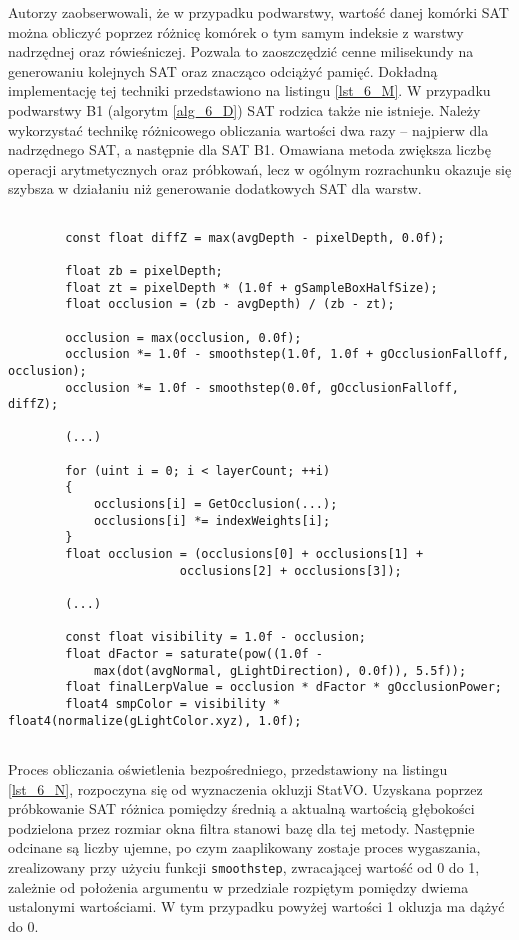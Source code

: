 		Autorzy \cite{statvo} zaobserwowali, że w przypadku podwarstwy, wartość danej komórki SAT można obliczyć poprzez różnicę komórek o tym samym indeksie z warstwy nadrzędnej oraz rówieśniczej. Pozwala to zaoszczędzić cenne milisekundy na generowaniu kolejnych SAT oraz znacząco odciążyć pamięć. Dokładną implementację tej techniki przedstawiono na listingu \ref{lst_6_M}. W przypadku podwarstwy B1 (algorytm \ref{alg_6_D}) SAT rodzica także nie istnieje. Należy wykorzystać technikę różnicowego obliczania wartości dwa razy -- najpierw dla nadrzędnego SAT, a następnie dla SAT B1. Omawiana metoda zwiększa liczbę operacji arytmetycznych oraz próbkowań, lecz w ogólnym rozrachunku okazuje się szybsza w działaniu niż generowanie dodatkowych SAT dla warstw. \pagebreak
		
		\begin{lstlisting}[language=HLSL,caption={Obliczenie oświetlenia bezpośredniego SSDO-B.},label={lst_6_N}]
		
		const float diffZ = max(avgDepth - pixelDepth, 0.0f);
		
		float zb = pixelDepth;
		float zt = pixelDepth * (1.0f + gSampleBoxHalfSize);
		float occlusion = (zb - avgDepth) / (zb - zt);
		
		occlusion = max(occlusion, 0.0f);
		occlusion *= 1.0f - smoothstep(1.0f, 1.0f + gOcclusionFalloff, occlusion);
		occlusion *= 1.0f - smoothstep(0.0f, gOcclusionFalloff, diffZ);
		
		(...)
		
		for (uint i = 0; i < layerCount; ++i)
		{
			occlusions[i] = GetOcclusion(...);
			occlusions[i] *= indexWeights[i];
		}
		float occlusion = (occlusions[0] + occlusions[1] + 
						occlusions[2] + occlusions[3]);
		
		(...)
		
		const float visibility = 1.0f - occlusion;
		float dFactor = saturate(pow((1.0f - 
			max(dot(avgNormal, gLightDirection), 0.0f)), 5.5f));
		float finalLerpValue = occlusion * dFactor * gOcclusionPower;
		float4 smpColor = visibility * float4(normalize(gLightColor.xyz), 1.0f);
		
		\end{lstlisting}
		
		Proces obliczania oświetlenia bezpośredniego, przedstawiony na listingu \ref{lst_6_N}, rozpoczyna się od wyznaczenia okluzji StatVO. Uzyskana poprzez próbkowanie SAT różnica pomiędzy średnią a aktualną wartością głębokości podzielona przez rozmiar okna filtra stanowi bazę dla tej metody. Następnie odcinane są liczby ujemne, po czym zaaplikowany zostaje proces wygaszania, zrealizowany przy użyciu funkcji \texttt{smoothstep}, zwracającej wartość od 0 do 1, zależnie od położenia argumentu w przedziale rozpiętym pomiędzy dwiema ustalonymi wartościami. W tym przypadku powyżej wartości 1 okluzja ma dążyć do 0.
		
